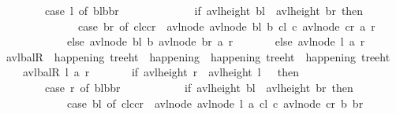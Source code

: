 \begin{isabellebody}
\ \ \ \ \ \ \ \ case\ l\ of\ {\isasymlangle}bl{\isacharcomma}{\kern0pt}{\isacharparenleft}{\kern0pt}b{\isacharcomma}{\kern0pt}{\isacharunderscore}{\kern0pt}{\isacharparenright}{\kern0pt}{\isacharcomma}{\kern0pt}br{\isasymrangle}\ {\isasymRightarrow}\isanewline
\ \ \ \ \ \ \ \ \ \ \ \ if\ avl{\isacharunderscore}{\kern0pt}height\ bl\ {\isacharless}{\kern0pt}\ avl{\isacharunderscore}{\kern0pt}height\ br\ then\isanewline
\ \ \ \ \ \ \ \ \ \ \ \ \ \ case\ br\ of\ {\isasymlangle}cl{\isacharcomma}{\kern0pt}{\isacharparenleft}{\kern0pt}c{\isacharcomma}{\kern0pt}{\isacharunderscore}{\kern0pt}{\isacharparenright}{\kern0pt}{\isacharcomma}{\kern0pt}cr{\isasymrangle}\ {\isasymRightarrow}\ avl{\isacharunderscore}{\kern0pt}node\ {\isacharparenleft}{\kern0pt}avl{\isacharunderscore}{\kern0pt}node\ bl\ b\ cl{\isacharparenright}{\kern0pt}\ c\ {\isacharparenleft}{\kern0pt}avl{\isacharunderscore}{\kern0pt}node\ cr\ a\ r\ {\isacharparenright}{\kern0pt}\isanewline
\ \ \ \ \ \ \ \ \ \ \ \ else\ avl{\isacharunderscore}{\kern0pt}node\ bl\ b\ {\isacharparenleft}{\kern0pt}avl{\isacharunderscore}{\kern0pt}node\ br\ a\ r{\isacharparenright}{\kern0pt}\isanewline
\ \ \ \ \ \ \ else\ avl{\isacharunderscore}{\kern0pt}node\ l\ a\ r{\isacharparenright}{\kern0pt}{\isachardoublequoteclose}\isanewline
\isanewline
\ \ \isamarkupfalse%
\ avl{\isacharunderscore}{\kern0pt}balR\ {\isacharcolon}{\kern0pt}{\isacharcolon}{\kern0pt}\ {\isachardoublequoteopen}happening\ tree{\isacharunderscore}{\kern0pt}ht\ {\isasymRightarrow}\ happening\ {\isasymRightarrow}\ happening\ tree{\isacharunderscore}{\kern0pt}ht\ {\isasymRightarrow}\ happening\ tree{\isacharunderscore}{\kern0pt}ht{\isachardoublequoteclose}\ \isanewline
\ \ \ \ {\isachardoublequoteopen}avl{\isacharunderscore}{\kern0pt}balR\ l\ a\ r\ {\isacharequal}{\kern0pt}\isanewline
\ \ \ \ \ \ {\isacharparenleft}{\kern0pt}if\ avl{\isacharunderscore}{\kern0pt}height\ r\ {\isacharequal}{\kern0pt}\ avl{\isacharunderscore}{\kern0pt}height\ l\ {\isacharplus}{\kern0pt}\ {}\ then\isanewline
\ \ \ \ \ \ \ \ case\ r\ of\ {\isasymlangle}bl{\isacharcomma}{\kern0pt}{\isacharparenleft}{\kern0pt}b{\isacharcomma}{\kern0pt}{\isacharunderscore}{\kern0pt}{\isacharparenright}{\kern0pt}{\isacharcomma}{\kern0pt}br{\isasymrangle}\ {\isasymRightarrow}\isanewline
\ \ \ \ \ \ \ \ \ \ if\ avl{\isacharunderscore}{\kern0pt}height\ bl\ {\isachargreater}{\kern0pt}\ avl{\isacharunderscore}{\kern0pt}height\ br\ then\isanewline
\ \ \ \ \ \ \ \ \ \ \ \ case\ bl\ of\ {\isasymlangle}cl{\isacharcomma}{\kern0pt}{\isacharparenleft}{\kern0pt}c{\isacharcomma}{\kern0pt}{\isacharunderscore}{\kern0pt}{\isacharparenright}{\kern0pt}{\isacharcomma}{\kern0pt}cr{\isasymrangle}\ {\isasymRightarrow}\ avl{\isacharunderscore}{\kern0pt}node\ {\isacharparenleft}{\kern0pt}avl{\isacharunderscore}{\kern0pt}node\ l\ a\ cl{\isacharparenright}{\kern0pt}\ c\ {\isacharparenleft}{\kern0pt}avl{\isacharunderscore}{\kern0pt}node\ cr\ b\ br{\isacharparenright}{\kern0pt}\isanewline

\end{isabellebody}
